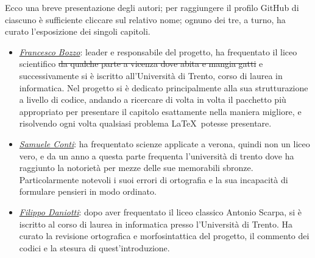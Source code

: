 \documentclass[class=book, crop=false, oneside]{standalone}
\begin{document}
Ecco una breve presentazione degli autori; per raggiungere il profilo GitHub di ciascuno è sufficiente cliccare sul relativo nome; ognuno dei tre, a turno, ha curato l'esposizione dei singoli capitoli.
\begin{itemize}
  \item \emph{\href{https://github.com/FrancescoBozzo}{Francesco Bozzo}}: leader e responsabile del progetto, ha frequentato il liceo scientifico \sout{da qualche parte a vicenza dove abita e mangia gatti} e successivamente si è iscritto all'Università di Trento, corso di laurea in informatica. Nel progetto si è dedicato principalmente alla sua strutturazione a livello di codice, andando a ricercare di volta in volta il pacchetto più appropriato per presentare il capitolo esattamente nella maniera migliore, e risolvendo ogni volta qualsiasi problema \LaTeX\ potesse presentare.
  \item \emph{\href{https://github.com/Samaretas}{Samuele Conti}}: ha frequentato scienze applicate a verona, quindi non un liceo vero, e da un anno a questa parte frequenta l'università di trento dove ha raggiunto la notorietà per mezze delle sue memorabili sbronze. Particolarmente notevoli i suoi errori di ortografia e la sua incapacità di formulare pensieri in modo ordinato.
  \item \emph{\href{https://github.com/dapips}{Filippo Daniotti}}: dopo aver frequentato il liceo classico Antonio Scarpa, si è iscritto al corso di laurea in informatica presso l'Università di Trento. Ha curato la revisione ortografica e morfosintattica del progetto, il commento dei codici e la stesura di quest'introduzione.
\end{itemize}
\end{document}
